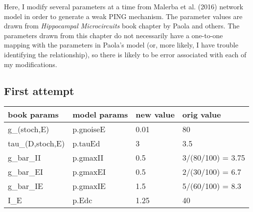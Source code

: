 \documentclass[11pt]{article}
\begin{document}
Here, I modify several parameters at a time from Malerba et al. (2016)
network model in order to generate a weak PING mechanism. The parameter
values are drawn from \emph{Hippocampal Microcircuits} book chapter by
Paola and others. The parameters drawn from this chapter do not
necessarily have a one-to-one mapping with the parameters in Paola's
model (or, more likely, I have trouble identifying the relationship), so
there is likely to be error associated with each of my modifications.

    \subsection{First attempt}\label{first-attempt}

\begin{longtable}[]{@{}llll@{}}
\toprule
book params & model params & new value & orig value\tabularnewline
\midrule
\endhead
g\_(stoch,E) & p.gnoiseE & 0.01 & 80\tabularnewline
tau\_(D,stoch,E) & p.tauEd & 3 & 3.5\tabularnewline
g\_bar\_II & p.gmaxII & 0.5 & 3/(80/100) = 3.75\tabularnewline
g\_bar\_EI & p.gmaxEI & 0.5 & 2/(30/100) = 6.7\tabularnewline
g\_bar\_IE & p.gmaxIE & 1.5 & 5/(60/100) = 8.3\tabularnewline
I\_E & p.Edc & 1.25 & 40\tabularnewline
\bottomrule
\end{longtable}
\end{document}
